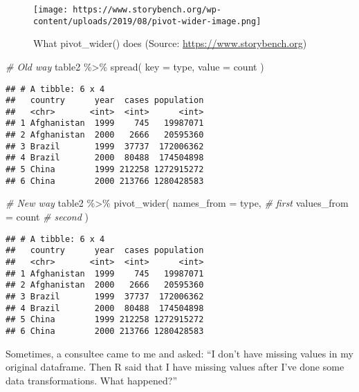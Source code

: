 \documentclass[
]{book}
\newenvironment{Shaded}{\begin{snugshade}}{\end{snugshade}}
\newcommand{\AttributeTok}[1]{\textcolor[rgb]{0.77,0.63,0.00}{#1}}
\newcommand{\CommentTok}[1]{\textcolor[rgb]{0.56,0.35,0.01}{\textit{#1}}}
\newcommand{\FunctionTok}[1]{\textcolor[rgb]{0.00,0.00,0.00}{#1}}
\newcommand{\NormalTok}[1]{#1}
\newcommand{\SpecialCharTok}[1]{\textcolor[rgb]{0.00,0.00,0.00}{#1}}
\begin{document}
\begin{figure}
\centering
\texttt{[image: https://www.storybench.org/wp-content/uploads/2019/08/pivot-wider-image.png]}
\caption{What pivot\_wider() does (Source: \url{https://www.storybench.org})}
\end{figure}

\begin{Shaded}
\begin{Highlighting}[]
\CommentTok{\# Old way}
\NormalTok{table2 }\SpecialCharTok{\%\textgreater{}\%}
  \FunctionTok{spread}\NormalTok{(}
    \AttributeTok{key =}\NormalTok{ type,}
    \AttributeTok{value =}\NormalTok{ count}
\NormalTok{  )}
\end{Highlighting}
\end{Shaded}

\begin{verbatim}
## # A tibble: 6 x 4
##   country      year  cases population
##   <chr>       <int>  <int>      <int>
## 1 Afghanistan  1999    745   19987071
## 2 Afghanistan  2000   2666   20595360
## 3 Brazil       1999  37737  172006362
## 4 Brazil       2000  80488  174504898
## 5 China        1999 212258 1272915272
## 6 China        2000 213766 1280428583
\end{verbatim}

\begin{Shaded}
\begin{Highlighting}[]
\CommentTok{\# New way}
\NormalTok{table2 }\SpecialCharTok{\%\textgreater{}\%}
  \FunctionTok{pivot\_wider}\NormalTok{(}
    \AttributeTok{names\_from =}\NormalTok{ type, }\CommentTok{\# first}
    \AttributeTok{values\_from =}\NormalTok{ count }\CommentTok{\# second}
\NormalTok{  )}
\end{Highlighting}
\end{Shaded}

\begin{verbatim}
## # A tibble: 6 x 4
##   country      year  cases population
##   <chr>       <int>  <int>      <int>
## 1 Afghanistan  1999    745   19987071
## 2 Afghanistan  2000   2666   20595360
## 3 Brazil       1999  37737  172006362
## 4 Brazil       2000  80488  174504898
## 5 China        1999 212258 1272915272
## 6 China        2000 213766 1280428583
\end{verbatim}

Sometimes, a consultee came to me and asked: ``I don't have missing values in my original dataframe. Then R said that I have missing values after I've done some data transformations. What happened?''
\end{document}
